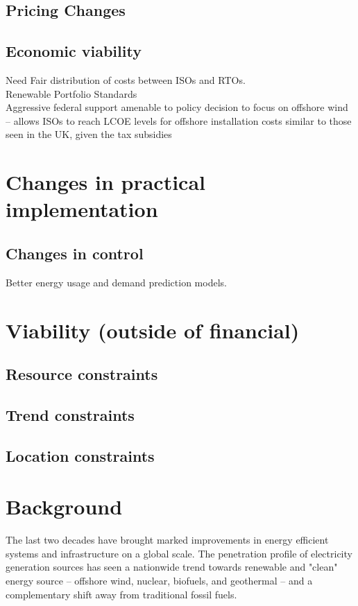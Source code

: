 \documentclass[plain]{article}
\newcommand{\1}{\mathbbm{1}}
\begin{document}
\subsection{Pricing Changes}
\subsection{Economic viability}
Need Fair distribution of costs between ISOs and RTOs. \cite{mitchell_review_2022}\\
Renewable Portfolio Standards\\
Aggressive federal support amenable to policy decision to focus on offshore wind -- allows ISOs to reach LCOE  levels for offshore installation costs similar to those seen in the UK, given the tax subsidies \cite{mitchell_review_2022}\\

\section{Changes in practical implementation}
\subsection{Changes in control}
Better energy usage and demand prediction models.

\section{Viability (outside of financial)}
\subsection{Resource constraints}
\subsection{Trend constraints}
\subsection{Location constraints}
\section{Background}
The last two decades have brought marked improvements in energy efficient systems and infrastructure on a global scale. The penetration profile of electricity generation sources has seen a nationwide trend towards renewable and "clean" energy source -- offshore wind, nuclear, biofuels, and geothermal -- and a complementary shift away from traditional fossil fuels. 
\end{document}
